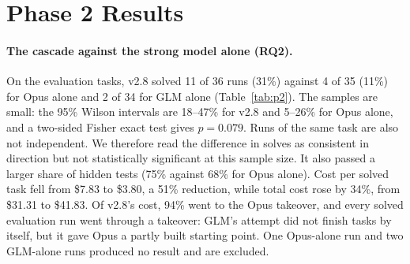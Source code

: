 \section{Phase 2 Results}
\label{sec:p2results}

\begin{table}[t]
\centering\small
\caption{Cascade (v2.8) and single-model baselines on the 18 evaluation tasks. Cost at public list prices.}
\label{tab:p2}
\end{table}

\paragraph{The cascade against the strong model alone (RQ2).}
On the evaluation tasks, v2.8 solved 11 of 36 runs (31\%) against 4 of 35 (11\%) for Opus alone and 2 of 34 for
GLM alone (Table~\ref{tab:p2}). The samples are small: the 95\% Wilson intervals are 18--47\% for v2.8 and
5--26\% for Opus alone, and a two-sided Fisher exact test gives $p = 0.079$. Runs of the same task are also not
independent. We therefore read the difference in solves as consistent in direction but not statistically
significant at this sample size. It also passed a larger share of hidden tests (75\% against 68\% for Opus alone).
Cost per solved task fell from \$7.83 to \$3.80, a 51\% reduction, while total cost rose by 34\%, from \$31.31
to \$41.83. Of v2.8's cost, 94\% went to the Opus takeover, and every solved evaluation run went through a
takeover: GLM's attempt did not finish tasks by itself, but it gave Opus a partly built starting point. One
Opus-alone run and two GLM-alone runs produced no result and are excluded.

